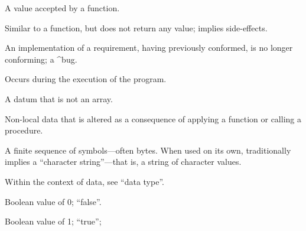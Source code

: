 \begin{description}
  A value accepted by a function.

  Similar to a function, but does not return any value; implies side-effects.

  An implementation of a requirement, having previously conformed, is no longer
  conforming; a ^bug.

  Occurs during the execution of the program.

  A datum that is not an array.

  Non-local data that is altered as a consequence of applying a function or
  calling a procedure.

  A finite sequence of symbols---often bytes. When used on its own,
  traditionally implies a ``character string''---that is, a string of character
  values.

  Within the context of data, see ``data type''.

  \dt{$\bot$}
  Boolean value of 0; ``false''.

  \dt{$\top$}
  Boolean value of 1; ``true'';
\end{description}

\enddeptgroup

